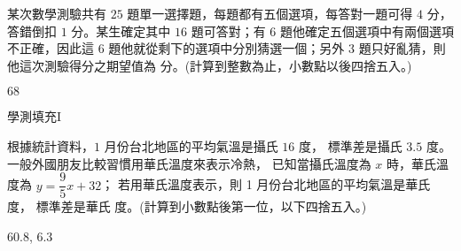 \begin{QUESTIONS}
\begin{QUESTION}
        \begin{ExamAnsRateInfo}{17}{36}{12}{3}
        \end{ExamAnsRateInfo}
        \begin{QBODY}
            某次數學測驗共有 $25$ 題單一選擇題，每題都有五個選項，每答對一題可得 $4$ 分，答錯倒扣 $1$ 分。某生確定其中 $16$ 題可答對；有 $6$ 題他確定五個選項中有兩個選項不正確，因此這 $6$ 題他就從剩下的選項中分別猜選一個；另外 $3$ 題只好亂猜，則他這次測驗得分之期望值為 
            \TCNBOX{\TCN\TCN} 分。(計算到整數為止，小數點以後四捨五入。)
        \end{QBODY}
        \begin{QFROMS}
        \end{QFROMS}
        \begin{QTAGS}\end{QTAGS}
        \begin{QANS}
            $68$
        \end{QANS}
        \begin{QSOLLIST}
        \end{QSOLLIST}
        \begin{QEMPTYSPACE}
        \end{QEMPTYSPACE}
    \end{QUESTION}
    \begin{QUESTION}
        \begin{ExamInfo}{92}{學測}{填充}{I}
        \end{ExamInfo}
        \begin{ExamAnsRateInfo}{38}{70}{35}{9}
        \end{ExamAnsRateInfo}
        \begin{QBODY}
            根據統計資料，$1$ 月份台北地區的平均氣溫是攝氏 $16$ 度，
            標準差是攝氏 $3.5$ 度。一般外國朋友比較習慣用華氏溫度來表示冷熱，
            已知當攝氏溫度為 $x$ 時，華氏溫度為 $y =\dfrac{9}{5}x + 32$；
            若用華氏溫度表示，則 1 月份台北地區的平均氣溫是華氏 
             度，
            標準差是華氏 
             度。(計算到小數點後第一位，以下四捨五入。)
        \end{QBODY}
        \begin{QFROMS}
        \end{QFROMS}
        \begin{QTAGS}\end{QTAGS}
        \begin{QANS}
            $60.8$, $6.3$
        \end{QANS}
        \begin{QSOLLIST}
        \end{QSOLLIST}
        \begin{QEMPTYSPACE}
        \end{QEMPTYSPACE}
    \end{QUESTION}
\end{QUESTIONS}
